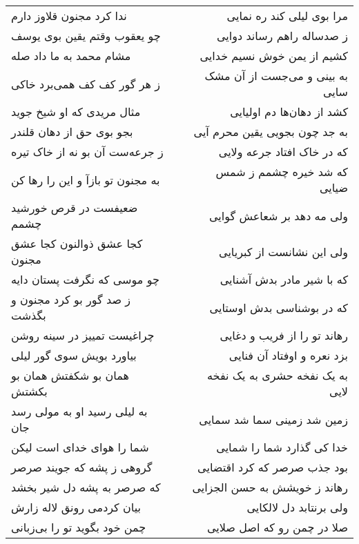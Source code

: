 \begin{center}
\begin{longtable}{l p{0.5cm} r}
\\
ندا کرد مجنون قلاوز دارم
&&
مرا بوی لیلی کند ره نمایی
\\
چو یعقوب وقتم یقین بوی یوسف
&&
ز صدساله راهم رساند دوایی
\\
مشام محمد به ما داد صله
&&
کشیم از یمن خوش نسیم خدایی
\\
ز هر گور کف کف همی‌برد خاکی
&&
به بینی و می‌جست از آن مشک سایی
\\
مثال مریدی که او شیخ جوید
&&
کشد از دهان‌ها دم اولیایی
\\
بجو بوی حق از دهان قلندر
&&
به جد چون بجویی یقین محرم آیی
\\
ز جرعه‌ست آن بو نه از خاک تیره
&&
که در خاک افتاد جرعه ولایی
\\
به مجنون تو بازآ و این را رها کن
&&
که شد خیره چشمم ز شمس ضیایی
\\
ضعیفست در قرص خورشید چشمم
&&
ولی مه دهد بر شعاعش گوایی
\\
کجا عشق ذوالنون کجا عشق مجنون
&&
ولی این نشانست از کبریایی
\\
چو موسی که نگرفت پستان دایه
&&
که با شیر مادر بدش آشنایی
\\
ز صد گور بو کرد مجنون و بگذشت
&&
که در بوشناسی بدش اوستایی
\\
چراغیست تمییز در سینه روشن
&&
رهاند تو را از فریب و دغایی
\\
بیاورد بویش سوی گور لیلی
&&
بزد نعره و اوفتاد آن فنایی
\\
همان بو شکفتش همان بو بکشتش
&&
به یک نفخه حشری به یک نفخه لایی
\\
به لیلی رسید او به مولی رسد جان
&&
زمین شد زمینی سما شد سمایی
\\
شما را هوای خدای است لیکن
&&
خدا کی گذارد شما را شمایی
\\
گروهی ز پشه که جویند صرصر
&&
بود جذب صرصر که کرد اقتضایی
\\
که صرصر به پشه دل شیر بخشد
&&
رهاند ز خویشش به حسن الجزایی
\\
بیان کردمی رونق لاله زارش
&&
ولی برنتابد دل لالکایی
\\
چمن خود بگوید تو را بی‌زبانی
&&
صلا در چمن رو که اصل صلایی
\\
\end{longtable}
\end{center}
